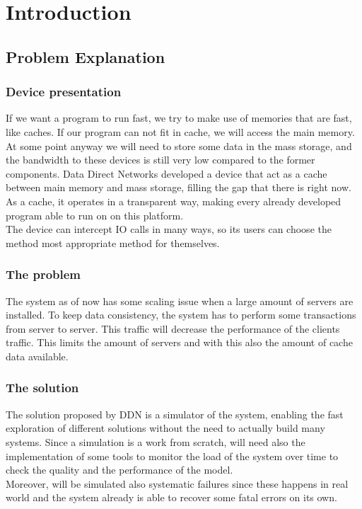 \section{Introduction}

\subsection{Problem Explanation}
\subsubsection*{Device presentation}
If we want a program to run fast, we try to make use of memories that are fast,
like caches. If our program can not fit in cache, we will access the main memory.
\\
At some point anyway we will need to store some data in the mass storage,
and the bandwidth to these devices is still very low compared to the former
components. 
Data Direct Networks developed a device that act as a cache between main memory
and mass storage, filling the gap that there is right now. \\
As a cache, it operates in a transparent way, making every already
developed program able to run on on this platform. \\
The device can intercept IO calls in many ways, so its users can choose the
method most appropriate method for themselves.

\subsubsection*{The problem}
The system as of now has some scaling issue when a large amount of servers are
installed. To keep data consistency, the system has to perform some transactions
from server to server. This traffic will decrease the performance of the
clients traffic. This limits the amount of servers and with this also the amount
of cache data available.

\subsubsection*{The solution}
The solution proposed by DDN is a simulator of the system, enabling the fast
exploration of different solutions without the need to actually build many
systems. Since a simulation is a work from scratch, will need also the
implementation of some tools to monitor the load of the system over time to
check the quality and the performance of the model. \\
Moreover, will be simulated also systematic failures since these happens in real
world and the system already is able to recover some fatal errors on its own.

